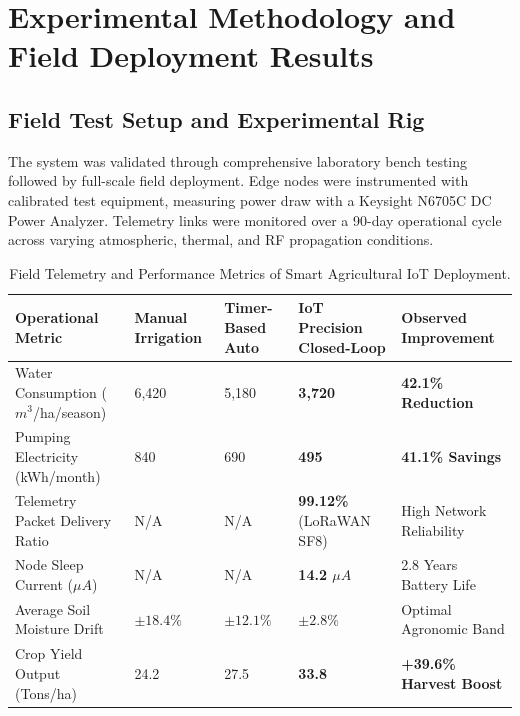 \section{Experimental Methodology and Field Deployment Results}

\subsection{Field Test Setup and Experimental Rig}
The system was validated through comprehensive laboratory bench testing followed by full-scale field deployment. Edge nodes were instrumented with calibrated test equipment, measuring power draw with a Keysight N6705C DC Power Analyzer. Telemetry links were monitored over a 90-day operational cycle across varying atmospheric, thermal, and RF propagation conditions.

\begin{table}[H]
\centering
\caption{Field Telemetry and Performance Metrics of Smart Agricultural IoT Deployment.}
\label{tab:iot_comp}
\begin{tabularx}{\linewidth}{lXXXX}
\toprule
\textbf{Operational Metric} & \textbf{Manual Irrigation} & \textbf{Timer-Based Auto} & \textbf{IoT Precision Closed-Loop} & \textbf{Observed Improvement} \\
\midrule
Water Consumption ($m^3$/ha/season) & 6,420 & 5,180 & \textbf{3,720} & \textbf{42.1\% Reduction} \\
Pumping Electricity (kWh/month) & 840 & 690 & \textbf{495} & \textbf{41.1\% Savings} \\
Telemetry Packet Delivery Ratio & N/A & N/A & \textbf{99.12\%} (LoRaWAN SF8) & High Network Reliability \\
Node Sleep Current ($\mu A$) & N/A & N/A & \textbf{14.2 $\mu A$} & 2.8 Years Battery Life \\
Average Soil Moisture Drift & $\pm 18.4\%$ & $\pm 12.1\%$ & \textbf{$\pm 2.8\%$} & Optimal Agronomic Band \\
Crop Yield Output (Tons/ha) & 24.2 & 27.5 & \textbf{33.8} & \textbf{+39.6\% Harvest Boost} \\
\bottomrule
\end{tabularx}
\end{table}

